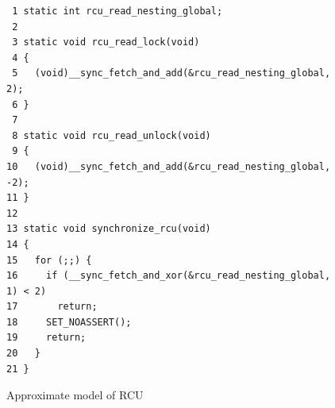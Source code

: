 \documentclass[conference]{IEEEtran}
\begin{document}

\begin{figure}[tb]
{ \scriptsize
\begin{verbatim}
 1 static int rcu_read_nesting_global;
 2 
 3 static void rcu_read_lock(void)
 4 {
 5   (void)__sync_fetch_and_add(&rcu_read_nesting_global, 2);
 6 }
 7 
 8 static void rcu_read_unlock(void)
 9 {
10   (void)__sync_fetch_and_add(&rcu_read_nesting_global, -2);
11 }
12 
13 static void synchronize_rcu(void)
14 {
15   for (;;) {
16     if (__sync_fetch_and_xor(&rcu_read_nesting_global, 1) < 2)
17       return;
18     SET_NOASSERT();
19     return;
20   }
21 }
\end{verbatim}
}
\caption{Approximate model of RCU}
\label{fig:Approximate Model of RCU}
\end{figure}
\end{document}
